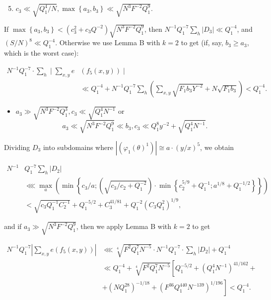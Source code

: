 \documentclass[10pt]{article}
\begin{document}
\begin{enumerate}
  \setcounter{enumi}{4}
  \item $c_{3} \ll \sqrt{Q_{1}^{4} / N}, \max \left\{a_{3}, b_{3}\right\} \ll \sqrt{N^{3} F^{-2} Q_{1}^{9}}$.
\end{enumerate}

If $\max \left\{a_{3}, b_{3}\right\}<\left(c_{3}^{2}+c_{3} Q^{-2}\right) \sqrt{N^{3} F^{-2} Q_{1}^{9}}$, then $N^{-1} Q_{1}^{-7} \sum_{h}\left|D_{3}\right| \ll Q_{1}^{-4}$, and $(S / N)^{8} \ll Q_{1}^{-4}$. Otherwise we use Lemma B with $k=2$ to get (if, say, $b_{3} \geqslant a_{3}$, which is the worst case):

$$
\begin{aligned}
N^{-1} Q_{1}^{-7} \cdot \sum_{h} \mid \sum_{x, y} e & \left(f_{5}(x, y)\right) \mid \\
& \ll Q_{1}^{-4}+N^{-1} Q_{1}^{-7} \sum_{h}\left(\sum_{x, y} \sqrt{F_{1} b_{3} Y^{-2}}+N \sqrt{F_{1} b_{3}}\right)<Q_{1}^{-4} .
\end{aligned}
$$

\begin{itemize}
  \item[6)] $a_{3} \gg \sqrt{N^{3} F^{-2} Q_{1}^{3}}, c_{3} \ll \sqrt{Q_{1}^{4} N^{-1}}$ or
$$
a_{3} \ll \sqrt{N^{3} F^{-2} Q_{1}^{9}} \ll b_{3}, c_{3} \ll Q_{1}^{8} y^{-2}+\sqrt{Q_{1}^{4} N^{-1}} .
$$
\end{itemize}

Dividing $D_{3}$ into subdomains where $\left|\left(\varphi_{1}(\theta)^{1}\right)\right| \cong a \cdot(y / x)^{5}$, we obtain

$$
\begin{aligned}
N^{-1} & Q_{1}^{-7} \sum_{h}\left|D_{2}\right| \\
& \lll \max _{a}\left(\min \left\{c_{3} / a ;\left(\sqrt{c_{3} / c_{2}+Q_{1}^{-2}}\right) \cdot \min \left\{c_{2}^{5 / 9}+Q_{1}^{-1} ; a^{1 / 8}+Q_{1}^{-1 / 2}\right\}\right\}\right) \\
& <\sqrt{c_{3} Q_{1}^{-1} C_{2}^{-1}}+Q_{1}^{-5 / 2}+C_{3}^{41 / 81}+Q_{1}^{-2}\left(C_{3} Q_{1}^{2}\right)^{1 / 9},
\end{aligned}
$$

and if $a_{3} \gg \sqrt{N^{3} F^{-2} Q_{1}^{9}}$, then we apply Lemma B with $k=2$ to get

$$
\begin{aligned}
N^{-1} Q_{1}^{-7}\left|\sum_{x, y} e\left(f_{5}(x, y)\right)\right| & \lll \sqrt[4]{F^{2} Q_{1}^{7} N^{-5}} \cdot N^{-1} Q_{1}^{-7} \cdot \sum_{h}\left|D_{2}\right|+Q_{1}^{-4} \\
& \ll Q_{1}^{-4}+\sqrt[4]{F^{2} Q_{1}^{7} N^{-5}}\left[Q_{1}^{-5 / 2}+\left(Q_{1}^{4} N^{-1}\right)^{41 / 162}+\right. \\
& \left.+\left(N Q_{1}^{28}\right)^{-1 / 18}+\left(F^{36} Q_{1}^{440} N^{-139}\right)^{1 / 196}\right]<Q_{1}^{-4} .
\end{aligned}
$$
\end{document}
